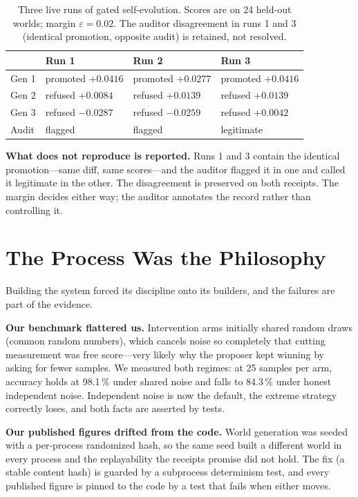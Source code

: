 \documentclass{llncs}
\begin{document}
\begin{table}
\caption{Three live runs of gated self-evolution. Scores are on 24 held-out
worlds; margin $\varepsilon=0.02$. The auditor disagreement in runs 1 and 3
(identical promotion, opposite audit) is retained, not resolved.}\label{tab:runs}
\centering
\begin{tabular}{@{}llll@{}}
\toprule
 & Run 1 & Run 2 & Run 3\\
\midrule
Gen 1 & promoted $+0.0416$ & promoted $+0.0277$ & promoted $+0.0416$\\
Gen 2 & refused $+0.0084$ & refused $+0.0139$ & refused $+0.0139$\\
Gen 3 & refused $-0.0287$ & refused $-0.0259$ & refused $+0.0042$\\
Audit & flagged & flagged & legitimate\\
\bottomrule
\end{tabular}
\end{table}

\textbf{What does not reproduce is reported.} Runs 1 and 3 contain the
identical promotion---same diff, same scores---and the auditor flagged it in
one and called it legitimate in the other. The disagreement is preserved on
both receipts. The margin decides either way; the auditor annotates the
record rather than controlling it.

\section{The Process Was the Philosophy}\label{sec:honesty}

Building the system forced its discipline onto its builders, and the failures
are part of the evidence.

\textbf{Our benchmark flattered us.} Intervention arms initially shared
random draws (common random numbers), which cancels noise so completely that
cutting measurement was free score---very likely why the proposer kept
winning by asking for fewer samples. We measured both regimes: at 25 samples
per arm, accuracy holds at 98.1\,\% under shared noise and falls to 84.3\,\%
under honest independent noise. Independent noise is now the default, the
extreme strategy correctly loses, and both facts are asserted by tests.

\textbf{Our published figures drifted from the code.} World generation was
seeded with a per-process randomized hash, so the same seed built a different
world in every process and the replayability the receipts promise did not
hold. The fix (a stable content hash) is guarded by a subprocess determinism
test, and every published figure is pinned to the code by a test that fails
when either moves.
\end{document}
